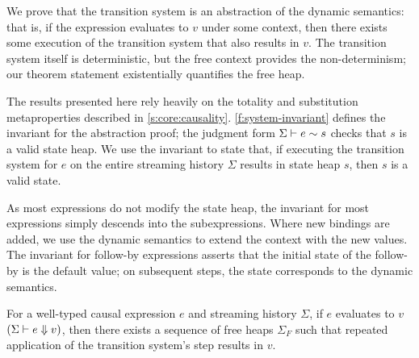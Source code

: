We prove that the transition system is an abstraction of the dynamic semantics: that is, if the expression evaluates to $v$ under some context, then there exists some execution of the transition system that also results in $v$.
The transition system itself is deterministic, but the free context provides the non-determinism; our theorem  statement existentially quantifies the free heap.



The results presented here rely heavily on the totality and substitution metaproperties described in \autoref{s:core:causality}.
\autoref{f:system-invariant} defines the invariant for the abstraction proof; the judgment form $\Sigma \vdash e \sim s$ checks that $s$ is a valid state heap.
We use the invariant to state that, if executing the transition system for $e$ on the entire streaming history $\Sigma$ results in state heap $s$, then $s$ is a valid state.

As most expressions do not modify the state heap, the invariant for most expressions simply descends into the subexpressions.
Where new bindings are added, we use the dynamic semantics to extend the context with the new values.
The invariant for follow-by expressions asserts that the initial state of the follow-by is the default value; on subsequent steps, the state corresponds to the dynamic semantics.

\begin{theorem}
  For a well-typed causal expression $e$ and streaming history $\Sigma$, if $e$ evaluates to $v$ $(\Sigma \vdash e \Downarrow v)$, then there exists a sequence of free heaps $\Sigma_{F}$ such that repeated application of the transition system's step results in $v$.
\end{theorem}

